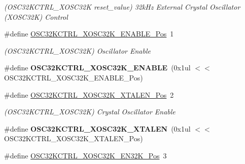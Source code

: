 \begin{DoxyCompactItemize}
\begin{DoxyCompactList}\small\item\em (O\+S\+C32\+K\+C\+T\+R\+L\+\_\+\+X\+O\+S\+C32\+K reset\+\_\+value) 32k\+Hz External Crystal Oscillator (X\+O\+S\+C32\+K) Control \end{DoxyCompactList}\item 
\hypertarget{group___s_a_m_l21___o_s_c32_k_c_t_r_l_ga0d7122ed419157c43c7c76da24469f6e}{}\#define \hyperlink{group___s_a_m_l21___o_s_c32_k_c_t_r_l_ga0d7122ed419157c43c7c76da24469f6e}{O\+S\+C32\+K\+C\+T\+R\+L\+\_\+\+X\+O\+S\+C32\+K\+\_\+\+E\+N\+A\+B\+L\+E\+\_\+\+Pos}~1\label{group___s_a_m_l21___o_s_c32_k_c_t_r_l_ga0d7122ed419157c43c7c76da24469f6e}

\begin{DoxyCompactList}\small\item\em (O\+S\+C32\+K\+C\+T\+R\+L\+\_\+\+X\+O\+S\+C32\+K) Oscillator Enable \end{DoxyCompactList}\item 
\hypertarget{group___s_a_m_l21___o_s_c32_k_c_t_r_l_ga32d877d8a016b0277e09268656487204}{}\#define {\bfseries O\+S\+C32\+K\+C\+T\+R\+L\+\_\+\+X\+O\+S\+C32\+K\+\_\+\+E\+N\+A\+B\+L\+E}~(0x1ul $<$$<$ O\+S\+C32\+K\+C\+T\+R\+L\+\_\+\+X\+O\+S\+C32\+K\+\_\+\+E\+N\+A\+B\+L\+E\+\_\+\+Pos)\label{group___s_a_m_l21___o_s_c32_k_c_t_r_l_ga32d877d8a016b0277e09268656487204}

\item 
\hypertarget{group___s_a_m_l21___o_s_c32_k_c_t_r_l_gaab290b9fde2ce0432bd019281585e60c}{}\#define \hyperlink{group___s_a_m_l21___o_s_c32_k_c_t_r_l_gaab290b9fde2ce0432bd019281585e60c}{O\+S\+C32\+K\+C\+T\+R\+L\+\_\+\+X\+O\+S\+C32\+K\+\_\+\+X\+T\+A\+L\+E\+N\+\_\+\+Pos}~2\label{group___s_a_m_l21___o_s_c32_k_c_t_r_l_gaab290b9fde2ce0432bd019281585e60c}

\begin{DoxyCompactList}\small\item\em (O\+S\+C32\+K\+C\+T\+R\+L\+\_\+\+X\+O\+S\+C32\+K) Crystal Oscillator Enable \end{DoxyCompactList}\item 
\hypertarget{group___s_a_m_l21___o_s_c32_k_c_t_r_l_gad2de3df4aa5f28ed5aa7aa3dd10f8233}{}\#define {\bfseries O\+S\+C32\+K\+C\+T\+R\+L\+\_\+\+X\+O\+S\+C32\+K\+\_\+\+X\+T\+A\+L\+E\+N}~(0x1ul $<$$<$ O\+S\+C32\+K\+C\+T\+R\+L\+\_\+\+X\+O\+S\+C32\+K\+\_\+\+X\+T\+A\+L\+E\+N\+\_\+\+Pos)\label{group___s_a_m_l21___o_s_c32_k_c_t_r_l_gad2de3df4aa5f28ed5aa7aa3dd10f8233}

\item 
\hypertarget{group___s_a_m_l21___o_s_c32_k_c_t_r_l_ga746636fe077be073185aec9422a5c7a6}{}\#define \hyperlink{group___s_a_m_l21___o_s_c32_k_c_t_r_l_ga746636fe077be073185aec9422a5c7a6}{O\+S\+C32\+K\+C\+T\+R\+L\+\_\+\+X\+O\+S\+C32\+K\+\_\+\+E\+N32\+K\+\_\+\+Pos}~3\label{group___s_a_m_l21___o_s_c32_k_c_t_r_l_ga746636fe077be073185aec9422a5c7a6}


\end{DoxyCompactItemize}

